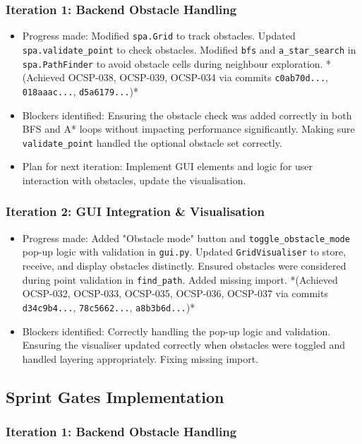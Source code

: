 \subsubsection{Iteration 1: Backend Obstacle Handling}
\begin{itemize}
	\item Progress made: Modified \verb|spa.Grid| to track obstacles. Updated \verb|spa.validate_point| to check obstacles. Modified \verb|bfs| and \verb|a_star_search| in \verb|spa.PathFinder| to avoid obstacle cells during neighbour exploration. *(Achieved OCSP-038, OCSP-039, OCSP-034 via commits \verb|c0ab70d...|, \verb|018aaac...|, \verb|d5a6179...|)*
	\item Blockers identified: Ensuring the obstacle check was added correctly in both BFS and A* loops without impacting performance significantly. Making sure \verb|validate_point| handled the optional obstacle set correctly.
	\item Plan for next iteration: Implement GUI elements and logic for user interaction with obstacles, update the visualisation.
\end{itemize}

\subsubsection{Iteration 2: GUI Integration \& Visualisation}
\begin{itemize}
	\item Progress made: Added "Obstacle mode" button and \verb|toggle_obstacle_mode| pop-up logic with validation in \verb|gui.py|. Updated \verb|GridVisualiser| to store, receive, and display obstacles distinctly. Ensured obstacles were considered during point validation in \verb|find_path|. Added missing import. *(Achieved OCSP-032, OCSP-033, OCSP-035, OCSP-036, OCSP-037 via commits \verb|d34c9b4...|, \verb|78c5662...|, \verb|a8b3b6d...|)*
	\item Blockers identified: Correctly handling the pop-up logic and validation. Ensuring the visualiser updated correctly when obstacles were toggled and handled layering appropriately. Fixing missing import.
\end{itemize}

\subsection{Sprint Gates Implementation}

\subsubsection{Iteration 1: Backend Obstacle Handling}

